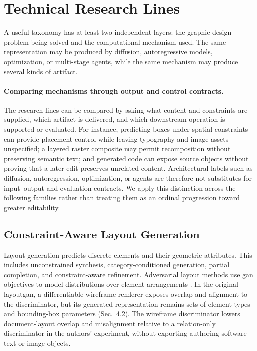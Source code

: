 \section{Technical Research Lines}
\label{sec:methods}
A useful taxonomy has at least two independent layers: the graphic-design problem being solved and the computational mechanism used.
The same representation may be produced by diffusion, autoregressive models, optimization, or multi-stage agents, while the same mechanism may produce several kinds of artifact.

\paragraph{Comparing mechanisms through output and control contracts.}
The research lines can be compared by asking what content and constraints are supplied, which artifact is delivered, and which downstream operation is supported or evaluated.
For instance, predicting boxes under spatial constraints can provide placement control while leaving typography and image assets unspecified; a layered raster composite may permit recomposition without preserving semantic text; and generated code can expose source objects without proving that a later edit preserves unrelated content.
Architectural labels such as diffusion, autoregression, optimization, or agents are therefore not substitutes for input--output and evaluation contracts.
We apply this distinction across the following families rather than treating them as an ordinal progression toward greater editability.

\subsection{Constraint-Aware Layout Generation}
Layout generation predicts discrete elements and their geometric attributes.
This includes unconstrained synthesis, category-conditioned generation, partial completion, and constraint-aware refinement.
Adversarial layout methods use \ac{gan} objectives to model distributions over element arrangements \citep{layoutgan2019,aclayoutgan2020,cglgan2022}.
In the original \ac{layoutgan}, a differentiable wireframe renderer exposes overlap and alignment to the discriminator, but its generated representation remains sets of element types and bounding-box parameters (Sec.~4.2).
The wireframe discriminator lowers document-layout overlap and misalignment relative to a relation-only discriminator in the authors' experiment, without exporting authoring-software text or image objects.

